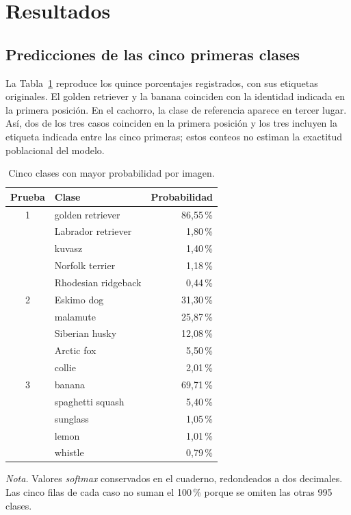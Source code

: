 \documentclass[10pt,a4paper,twocolumn]{article}
\newcommand{\pc}[1]{#1\,\%}
\begin{document}
\section{Resultados}
\subsection{Predicciones de las cinco primeras clases}
La Tabla~\ref{tab:resultados} reproduce los quince porcentajes registrados, con sus etiquetas originales. El golden retriever y la banana coinciden con la identidad indicada en la primera posición. En el cachorro, la clase de referencia aparece en tercer lugar. Así, dos de los tres casos coinciden en la primera posición y los tres incluyen la etiqueta indicada entre las cinco primeras; estos conteos no estiman la exactitud poblacional del modelo.

\begin{table}[tb]
\centering
\caption{Cinco clases con mayor probabilidad por imagen.}
\label{tab:resultados}
\small
\begin{tabular}{cl r}
\hline
Prueba & Clase & Probabilidad \\
\hline
1 & golden retriever & \pc{86,55} \\
  & Labrador retriever & \pc{1,80} \\
  & kuvasz & \pc{1,40} \\
  & Norfolk terrier & \pc{1,18} \\
  & Rhodesian ridgeback & \pc{0,44} \\
\hline
2 & Eskimo dog & \pc{31,30} \\
  & malamute & \pc{25,87} \\
  & Siberian husky & \pc{12,08} \\
  & Arctic fox & \pc{5,50} \\
  & collie & \pc{2,01} \\
\hline
3 & banana & \pc{69,71} \\
  & spaghetti squash & \pc{5,40} \\
  & sunglass & \pc{1,05} \\
  & lemon & \pc{1,01} \\
  & whistle & \pc{0,79} \\
\hline
\end{tabular}
\par\smallskip
\begin{minipage}{\columnwidth}\footnotesize
\textit{Nota.} Valores \textit{softmax} conservados en el cuaderno, redondeados a dos decimales. Las cinco filas de cada caso no suman el 100\,\% porque se omiten las otras 995 clases.
\end{minipage}
\end{table}
\end{document}
